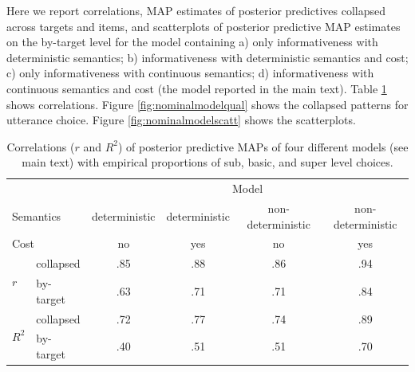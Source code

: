 \documentclass[11pt]{article}
\newcommand{\tableref}[1]{Table \ref{#1}}
\newcommand{\figref}[1]{Figure \ref{#1}}
\begin{document}
Here we report correlations, MAP estimates of posterior predictives collapsed across targets and items, and scatterplots of posterior predictive MAP estimates on the by-target level for the model containing a) only informativeness with deterministic semantics; b) informativeness with deterministic semantics and cost; c) only informativeness with continuous semantics; d) informativeness with continuous semantics and cost (the model reported in the main text). \tableref{tab:nominalmodelcorr} shows correlations. \figref{fig:nominalmodelqual} shows the collapsed patterns for utterance choice. \figref{fig:nominalmodelscatt} shows the scatterplots.

\begin{table}
\centering
\caption{Correlations ($r$ and $R^2$) of posterior predictive MAPs of four different models (see main text) with empirical proportions of sub, basic, and super level choices.}
	\begin{tabular}{l l c c c c}
	\toprule
	& & \multicolumn{4}{c}{Model}\\
	\multicolumn{2}{l}{Semantics}  & deterministic & deterministic & non-deterministic & non-deterministic\\
	\multicolumn{2}{l}{Cost} &  no & yes & no & yes \\
	\midrule
	\multirow{2}{*}{$r$} & collapsed & .85 & .88 & .86 & .94\\
	& by-target & .63 & .71 & .71 & .84\\
	\midrule
	\multirow{2}{*}{$R^2$} & collapsed & .72 & .77 & .74 & .89\\
	& by-target & .40 & .51 & .51 & .70\\
	\bottomrule
	\end{tabular}
	\label{tab:nominalmodelcorr}
\end{table}
\end{document}
